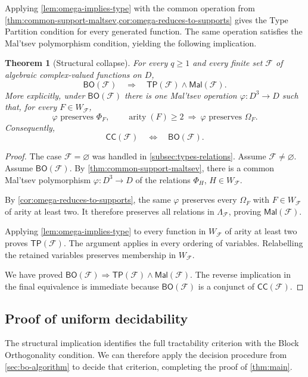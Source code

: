 \documentclass[11pt,letterpaper,onecolumn]{article}
\theoremstyle{plain}
\newtheorem{theorem}{Theorem}[section]
\theoremstyle{definition}
\theoremstyle{remark}
\newcommand{\cF}{\mathcal F}
\newcommand{\CC}{\mathsf{CC}}
\newcommand{\BO}{\mathsf{BO}}
\newcommand{\TP}{\mathsf{TP}}
\newcommand{\Mal}{\mathsf{Mal}}
\newcommand{\SuppRel}[1]{\Phi_{#1}}
\newcommand{\RowEq}[1]{\Omega_{#1}}
\DeclareMathOperator{\arity}{arity}
\begin{document}
Applying \cref{lem:omega-implies-type} with the common operation from
\cref{thm:common-support-maltsev,cor:omega-reduces-to-supports} gives the Type Partition
condition for every generated function.  The same operation satisfies the
Mal'tsev polymorphism condition, yielding the following implication.

\begin{theorem}[Structural collapse]
\label{thm:structural-collapse}
For every $q\ge1$ and every finite set $\cF$ of
algebraic complex-valued functions on $D$,
\[
  \BO(\cF)\quad\Longrightarrow\quad\TP(\cF)\wedge\Mal(\cF).
\]
More explicitly, under $\BO(\cF)$ there is one Mal'tsev operation
$\varphi:D^3\to D$ such that, for every $F\in W_{\cF}$,
\begin{equation*}
  \varphi\text{ preserves }\SuppRel F,
  \qquad \arity(F)\ge2\ \Longrightarrow\ \varphi\text{ preserves }\RowEq F.
\end{equation*}
Consequently,
\[
  \CC(\cF)\quad\Longleftrightarrow\quad\BO(\cF).
\]
\end{theorem}

\begin{proof}
The case $\cF=\varnothing$ was handled in \cref{subsec:types-relations}. Assume
$\cF\ne\varnothing$.
Assume $\BO(\cF)$.  By \cref{thm:common-support-maltsev}, there is a common
Mal'tsev polymorphism $\varphi:D^3\to D$ of the relations $\SuppRel H$,
$H\in W_{\cF}$.

By \cref{cor:omega-reduces-to-supports}, the same $\varphi$ preserves every
$\RowEq F$ with $F\in W_{\cF}$ of arity at least two.  It therefore preserves
all relations in $\Lambda_{\cF}$, proving $\Mal(\cF)$.

Applying \cref{lem:omega-implies-type} to every function in $W_{\cF}$ of
arity at least two proves $\TP(\cF)$.  The argument applies in every
ordering of variables. Relabelling the retained variables preserves membership
in $W_{\cF}$.

We have proved $\BO(\cF)\Rightarrow\TP(\cF)\wedge\Mal(\cF)$.  The reverse
implication in the final equivalence is immediate because $\BO(\cF)$ is a
conjunct of $\CC(\cF)$.
\end{proof}

\subsection{Proof of uniform decidability}

The structural implication identifies the full tractability criterion
with the Block Orthogonality condition.  We can therefore apply the
decision procedure from \cref{sec:bo-algorithm} to decide that criterion,
completing the proof of \cref{thm:main}.
\end{document}

